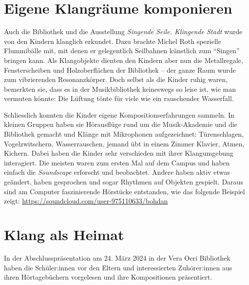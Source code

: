 \documentclass[a4paper,
fontsize=11pt,
oneside,
numbers=noperiodatend,
parskip=half-,
bibliography=totoc,
final
]{scrartcl}
\begin{document}
\hypertarget{eigene-klangruxe4ume-komponieren}{%
\section{Eigene Klangräume
komponieren}\label{eigene-klangruxe4ume-komponieren}}

Auch die Bibliothek und die Ausstellung \emph{Singende Seile. Klingende
Stadt} wurde von den Kindern klanglich erkundet. Dazu brachte Michel
Roth spezielle Flummibälle mit, mit denen er gelegentlich Seilbahnen
künstlich zum \enquote{Singen} bringen kann. Als Klangobjekte dienten
den Kindern aber nun die Metallregale, Fensterscheiben und
Holzoberflächen der Bibliothek -- der ganze Raum wurde zum vibrierenden
Resonanzkörper. Doch selbst als die Kinder ruhig waren, bemerkten sie,
dass es in der Musikbibliothek keineswegs so leise ist, wie man vermuten
könnte: Die Lüftung tönte für viele wie ein rauschender Wasserfall.

Schliesslich konnten die Kinder eigene Kompositionserfahrungen sammeln.
In kleinen Gruppen haben sie Hörausflüge rund um die Musik-Akademie und
die Bibliothek gemacht und Klänge mit Mikrophonen aufgezeichnet:
Türenschlagen, Vogelzwitschern, Wasserrauschen, jemand übt in einem
Zimmer Klavier, Atmen, Kichern. Dabei haben die Kinder sehr verschieden
mit ihrer Klangumgebung interagiert. Die meisten waren zum ersten Mal
auf dem Campus und haben einfach die \emph{Soundscape} erforscht und
beobachtet. Andere haben aktiv etwas geändert, haben gesprochen und
sogar Rhythmen auf Objekten gespielt. Daraus sind am Computer
faszinierende Hörstücke entstanden, wie das folgende Beispiel zeigt:
\url{https://soundcloud.com/user-975110633/bohdan}

\hypertarget{klang-als-heimat}{%
\section{Klang als Heimat}\label{klang-als-heimat}}

In der Abschlusspräsentation am 24. März 2024 in der Vera Oeri
Bibliothek haben die Schüler:innen vor den Eltern und interessierten
Zuhörer:innen aus ihren Hörtagebüchern vorgelesen und ihre Kompositionen
präsentiert.
\end{document}
